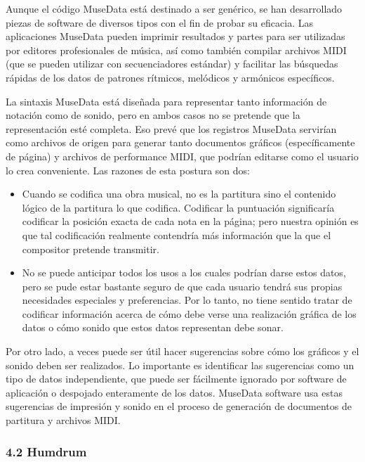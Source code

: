 \documentclass[]{article}
\begin{document}
Aunque el código MuseData está destinado a ser genérico, se han
desarrollado piezas de software de diversos tipos con el fin de probar
su eficacia. Las aplicaciones MuseData pueden imprimir resultados y
partes para ser utilizadas por editores profesionales de música, así
como también compilar archivos MIDI (que se pueden utilizar con
secuenciadores estándar) y facilitar las búsquedas rápidas de los datos
de patrones rítmicos, melódicos y armónicos específicos.

La sintaxis MuseData está diseñada para representar tanto información de
notación como de sonido, pero en ambos casos no se pretende que la
representación esté completa. Eso prevé que los registros MuseData
servirían como archivos de origen para generar tanto documentos gráficos
(específicamente de página) y archivos de performance MIDI, que podrían
editarse como el usuario lo crea conveniente. Las razones de esta
postura son dos:

\begin{itemize}
\item
  Cuando se codifica una obra musical, no es la partitura sino el
  contenido lógico de la partitura lo que codifica. Codificar la
  puntuación significaría codificar la posición exacta de cada nota en
  la página; pero nuestra opinión es que tal codificación realmente
  contendría más información que la que el compositor pretende
  transmitir.
\item
  No se puede anticipar todos los usos a los cuales podrían darse estos
  datos, pero se pude estar bastante seguro de que cada usuario tendrá
  sus propias necesidades especiales y preferencias. Por lo tanto, no
  tiene sentido tratar de codificar información acerca de cómo debe
  verse una realización gráfica de los datos o cómo sonido que estos
  datos representan debe sonar.
\end{itemize}

Por otro lado, a veces puede ser útil hacer sugerencias sobre cómo los
gráficos y el sonido deben ser realizados. Lo importante es identificar
las sugerencias como un tipo de datos independiente, que puede ser
fácilmente ignorado por software de aplicación o despojado enteramente
de los datos. MuseData software usa estas sugerencias de impresión y
sonido en el proceso de generación de documentos de partitura y archivos
MIDI.

\hypertarget{humdrum}{%
\subsubsection{4.2 Humdrum}\label{humdrum}}
\end{document}
